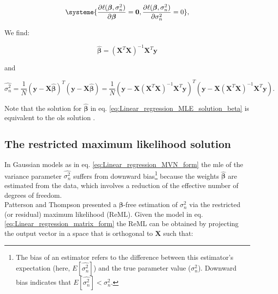 \begin{equation} \label{eq:Linear_regression_MLE_system}
\systeme{
    \dfrac{\partial \ell(\boldsymbol{\beta}, \sigma_n^2)}{\partial \boldsymbol{\beta}} = \mathbf{0},
    \dfrac{\partial \ell(\boldsymbol{\beta}, \sigma_n^2)}{\partial \sigma_n^2} = 0
    },
\end{equation}

We find:

\begin{equation} \label{eq:Linear_regression_MLE_solution_beta}
\hat{\boldsymbol{\beta}} = (\mathbf{X}^T\mathbf{X})^{-1}\mathbf{X}^T\mathbf{y} 
\end{equation}

and

\begin{equation} \label{eq:Linear_regression_MLE_solution_sigma}
 \hat{\sigma_n^2} = \frac{1}{N}(\mathbf{y}-\mathbf{X}\hat{\boldsymbol{\beta}})^T(\mathbf{y}-\mathbf{X}\hat{\boldsymbol{\beta}}) = \frac{1}{N}(\mathbf{y}-\mathbf{X}(\mathbf{X}^T\mathbf{X})^{-1}\mathbf{X}^T\mathbf{y})^T(\mathbf{y}-\mathbf{X}(\mathbf{X}^T\mathbf{X})^{-1}\mathbf{X}^T\mathbf{y}). 
\end{equation}

Note that the solution for $\hat{\boldsymbol{\beta}}$ in eq. \eqref{eq:Linear_regression_MLE_solution_beta} is equivalent to the \gls{ols} solution \cite{hayashi2000econometrics}.

\newpage

\subsection{The restricted maximum likelihood solution}

In Gaussian models as in eq. \eqref{eq:Linear_regression_MVN_form} the \gls{mle} of the variance parameter $\hat{\sigma_n^2}$ suffers from downward bias\footnote{The bias of an estimator refers to the difference between this estimator’s expectation (here, $E[\hat{\sigma_n^2}]$) and the true parameter value ($\sigma_n^2$).
Downward bias indicates that $E[\hat{\sigma_n^2}] < \sigma_n^2$.} because the weights $\hat{\boldsymbol{\beta}}$ are estimated from the data, which involves a reduction of the effective number of degrees of freedom. \\

Patterson and Thompson \cite{patterson1971recovery} presented a $\boldsymbol{\beta}$-free estimation of $\sigma_n^2$ via the restricted (or residual) maximum likelihood (ReML).
Given the model in eq. \eqref{eq:Linear_regression_matrix_form} the ReML can be obtained by projecting the output vector in a space that is orthogonal to $\mathbf{X}$ such that:

